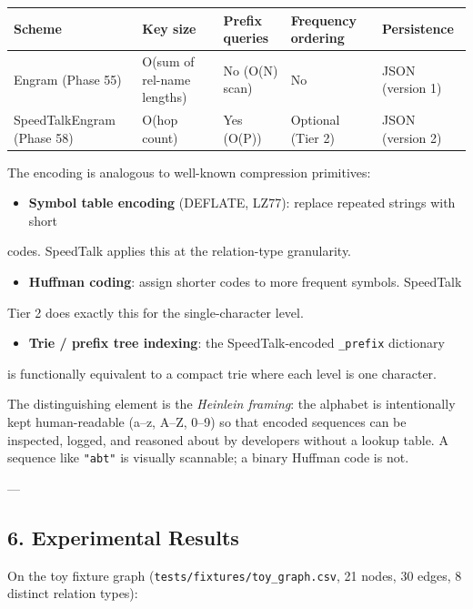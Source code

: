\begin{center}
{\footnotesize
\begin{tabularx}{\columnwidth}{|>{\raggedright\arraybackslash}X|>{\raggedright\arraybackslash}X|>{\raggedright\arraybackslash}X|>{\raggedright\arraybackslash}X|>{\raggedright\arraybackslash}X|}
\hline
Scheme & Key size & Prefix queries & Frequency ordering & Persistence \\ \hline
Engram (Phase 55) & O(sum of rel-name lengths) & No (O(N) scan) & No & JSON (version 1) \\ \hline
SpeedTalkEngram (Phase 58) & O(hop count) & Yes (O(P)) & Optional (Tier 2) & JSON (version 2) \\ \hline
\end{tabularx}
}
\end{center}

The encoding is analogous to well-known compression primitives:

\begin{itemize}
\item \textbf{Symbol table encoding} (DEFLATE, LZ77): replace repeated strings with short
\end{itemize}
  codes.  SpeedTalk applies this at the relation-type granularity.
\begin{itemize}
\item \textbf{Huffman coding}: assign shorter codes to more frequent symbols.  SpeedTalk
\end{itemize}
  Tier 2 does exactly this for the single-character level.
\begin{itemize}
\item \textbf{Trie / prefix tree indexing}: the SpeedTalk-encoded \texttt{\_prefix} dictionary
\end{itemize}
  is funct\-ionally equivalent to a compact trie where each level is one character.

The disti\-nguishing element is the \textit{Heinlein framing}: the alphabet is inten\-tionally
kept human-readable (a–z, A–Z, 0–9) so that encoded sequences can be inspected,
logged, and reasoned about by developers without a lookup table.  A sequence like
\texttt{"abt"} is visually scannable; a binary Huffman code is not.

---

\subsection{6. Experi\-mental Results}

On the toy fixture graph (\texttt{tests/fixtures/toy\_graph.csv}, 21 nodes, 30 edges,
8 distinct relation types):

